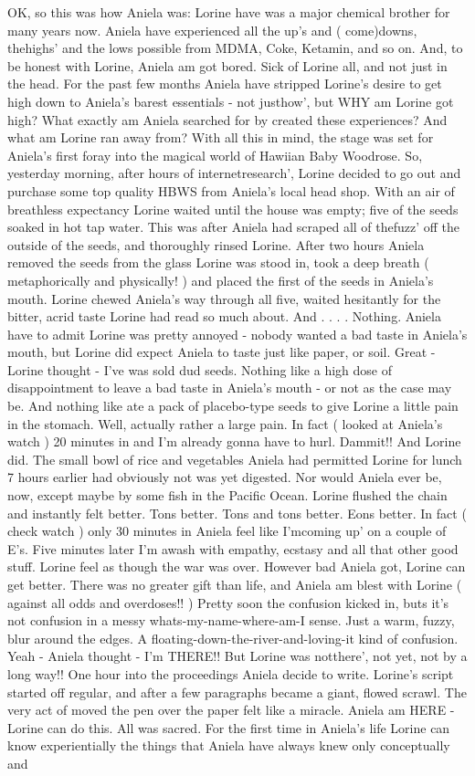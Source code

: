 \documentclass[12pt]{book}
\begin{document}
OK, so this was how Aniela was: Lorine have was a major chemical brother for many years now. Aniela have experienced all the up's and ( come)downs, thehighs' and the lows possible from MDMA, Coke, Ketamin, and so on. And, to be honest with Lorine, Aniela am got bored. Sick of Lorine all, and not just in the head. For the past few months Aniela have stripped Lorine's desire to get high down to Aniela's barest essentials - not justhow', but WHY am Lorine got high? What exactly am Aniela searched for by created these experiences? And what am Lorine ran away from? With all this in mind, the stage was set for Aniela's first foray into the magical world of Hawiian Baby Woodrose. So, yesterday morning, after hours of internetresearch', Lorine decided to go out and purchase some top quality HBWS from Aniela's local head shop. With an air of breathless expectancy Lorine waited until the house was empty; five of the seeds soaked in hot tap water. This was after Aniela had scraped all of thefuzz' off the outside of the seeds, and thoroughly rinsed Lorine. After two hours Aniela removed the seeds from the glass Lorine was stood in, took a deep breath ( metaphorically and physically! ) and placed the first of the seeds in Aniela's mouth. Lorine chewed Aniela's way through all five, waited hesitantly for the bitter, acrid taste Lorine had read so much about. And . . .  . Nothing. Aniela have to admit Lorine was pretty annoyed - nobody wanted a bad taste in Aniela's mouth, but Lorine did expect Aniela to taste just like paper, or soil. Great - Lorine thought - I've was sold dud seeds. Nothing like a high dose of disappointment to leave a bad taste in Aniela's mouth - or not as the case may be. And nothing like ate a pack of placebo-type seeds to give Lorine a little pain in the stomach. Well, actually rather a large pain. In fact ( looked at Aniela's watch ) 20 minutes in and I'm already gonna have to hurl. Dammit!! And Lorine did. The small bowl of rice and vegetables Aniela had permitted Lorine for lunch 7 hours earlier had obviously not was yet digested. Nor would Aniela ever be, now, except maybe by some fish in the Pacific Ocean. Lorine flushed the chain and instantly felt better. Tons better. Tons and tons better. Eons better. In fact ( check watch ) only 30 minutes in Aniela feel like I'mcoming up' on a couple of E's. Five minutes later I'm awash with empathy, ecstasy and all that other good stuff. Lorine feel as though the war was over. However bad Aniela got, Lorine can get better. There was no greater gift than life, and Aniela am blest with Lorine ( against all odds and overdoses!! ) Pretty soon the confusion kicked in, buts it's not confusion in a messy whats-my-name-where-am-I sense. Just a warm, fuzzy, blur around the edges. A floating-down-the-river-and-loving-it kind of confusion. Yeah - Aniela thought - I'm THERE!! But Lorine was notthere', not yet, not by a long way!! One hour into the proceedings Aniela decide to write. Lorine's script started off regular, and after a few paragraphs became a giant, flowed scrawl. The very act of moved the pen over the paper felt like a miracle. Aniela am HERE - Lorine can do this. All was sacred. For the first time in Aniela's life Lorine can know experientially the things that Aniela have always knew only conceptually and 
\end{document}
